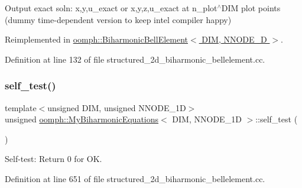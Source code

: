 Output exact soln\+: x,y,u\+\_\+exact or x,y,z,u\+\_\+exact at n\+\_\+plot$^\wedge$\+D\+IM plot points (dummy time-\/dependent version to keep intel compiler happy) 



Reimplemented in \hyperlink{classoomph_1_1BiharmonicBellElement_ac383ee9d4eedfe0646062847af2a9b2e}{oomph\+::\+Biharmonic\+Bell\+Element$<$ D\+I\+M, N\+N\+O\+D\+E\+\_\+D $>$}.



Definition at line 132 of file structured\+\_\+2d\+\_\+biharmonic\+\_\+bellelement.\+cc.

\mbox{\label{classoomph_1_1MyBiharmonicEquations_a6898ff065e57f8e765440da81075cf3d}} 
\subsubsection{\texorpdfstring{self\+\_\+test()}{self\_test()}}
{\footnotesize\ttfamily template$<$unsigned D\+IM, unsigned N\+N\+O\+D\+E\+\_\+1D$>$ \\
unsigned \hyperlink{classoomph_1_1MyBiharmonicEquations}{oomph\+::\+My\+Biharmonic\+Equations}$<$ D\+IM, N\+N\+O\+D\+E\+\_\+1D $>$\+::self\+\_\+test (\begin{DoxyParamCaption}{ }\end{DoxyParamCaption})}



Self-\/test\+: Return 0 for OK. 



Definition at line 651 of file structured\+\_\+2d\+\_\+biharmonic\+\_\+bellelement.\+cc.

\mbox{\label{classoomph_1_1MyBiharmonicEquations_a9da77a58e4d4a96e6cfe1eb708bca631}} 
